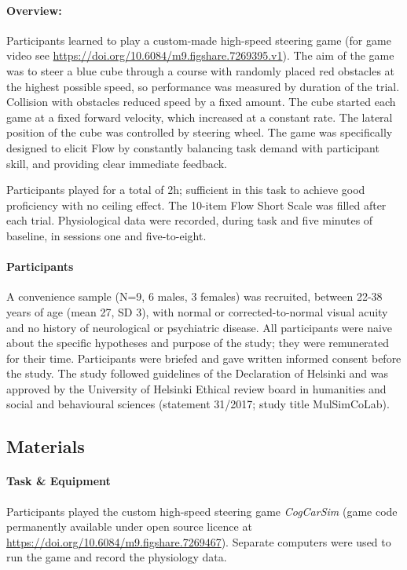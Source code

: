 \documentclass[10pt,letterpaper,floatsintext]{article}
\newcommand{\tapprx}{\raisebox{0.4ex}{\texttildelow}}
\begin{document}
\paragraph{Overview:}
Participants learned to play a custom-made high-speed steering game (for game video see \url{https://doi.org/10.6084/m9.figshare.7269395.v1}). The aim of the game was to steer a blue cube through a course with randomly placed red obstacles at the highest possible speed, so performance was measured by duration of the trial. Collision with obstacles reduced speed by a fixed amount. The cube started each game at a fixed forward velocity, which increased at a constant rate. The lateral position of the cube was controlled by steering wheel. The game was specifically designed to elicit Flow by constantly balancing task demand with participant skill, and providing clear immediate feedback.

Participants played for a total of \tapprx2h; sufficient in this task to achieve good proficiency with no ceiling effect. The 10-item Flow Short Scale was filled after each trial. Physiological data were recorded, during task and five minutes of baseline, in sessions one and five-to-eight.


\paragraph{Participants}
A convenience sample (N=9, 6 males, 3 females) was recruited, between 22-38 years of age (mean 27, SD 3), with normal or corrected-to-normal visual acuity and no history of neurological or psychiatric disease. All participants were naive about the specific hypotheses and purpose of the study; they were remunerated for their time. Participants were briefed and gave written informed consent before the study. The study followed guidelines of the Declaration of Helsinki and was approved by the University of Helsinki Ethical review board in humanities and social and behavioural sciences (statement 31/2017; study title MulSimCoLab).

\subsection*{Materials}
\paragraph{Task \& Equipment} Participants played the custom high-speed steering game {\it CogCarSim} (game code permanently available under open source licence at \url{https://doi.org/10.6084/m9.figshare.7269467}). Separate computers were used to run the game and record the physiology data.
\end{document}
